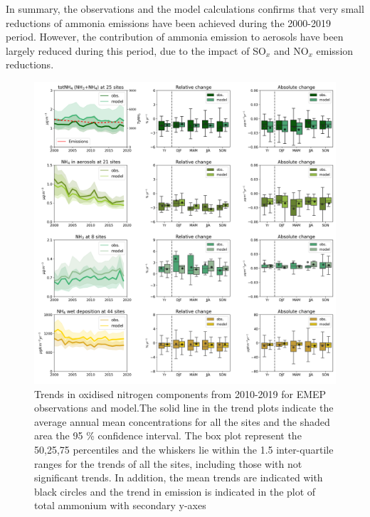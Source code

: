 In summary, the observations and the model calculations confirms that very small reductions of ammonia emissions have been achieved during the 2000-2019 period. However, the contribution of ammonia emission to aerosols have been largely reduced during this period, due to the impact of SO$_x$ and NO$_x$ emission reductions.





\begin{figure}
	\centering
	\includegraphics[width=0.74\paperwidth]{FIGS_TRENDS/Nred_trends.png}
	\caption{\label{fig:Nred_trends}Trends in oxidised nitrogen components from 2010-2019 for EMEP observations and model.The solid line in the trend plots indicate the average annual mean concentrations for all the sites and the shaded area the 95 \% confidence interval. The box plot represent the 50,25,75 percentiles and the whiskers lie within the 1.5 inter-quartile ranges for the trends of all the sites, including those with not significant trends. In addition, the mean trends are indicated with black circles and the trend in \nhiii emission is indicated in the plot of total ammonium with secondary y-axes}
\end{figure}

